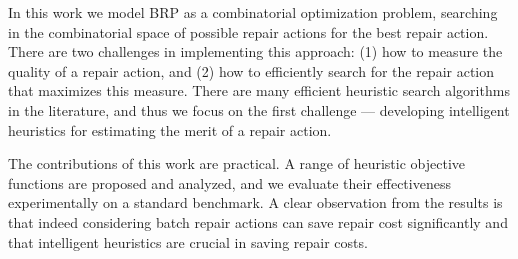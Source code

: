 \documentclass[letterpaper]{article}
\newcommand\meir[1]{\textcolor{red}{meir: #1}}
\begin{document}
In this work we model BRP as a combinatorial optimization problem, searching in the combinatorial space of possible repair actions for the best repair action. There are two challenges in implementing this approach: (1) how to measure the quality of a repair action, and (2) how to efficiently search for the repair action that maximizes this measure. There are many efficient heuristic search algorithms in the literature, and thus we focus on the first challenge --- developing intelligent heuristics for estimating the merit of a repair action.






The contributions of this work are practical. A range of heuristic objective functions are proposed and analyzed, and we evaluate their effectiveness experimentally on a standard benchmark. A clear observation from the results is that indeed considering batch repair actions can save repair cost significantly and that intelligent heuristics are crucial in saving repair costs.%

\end{document}

